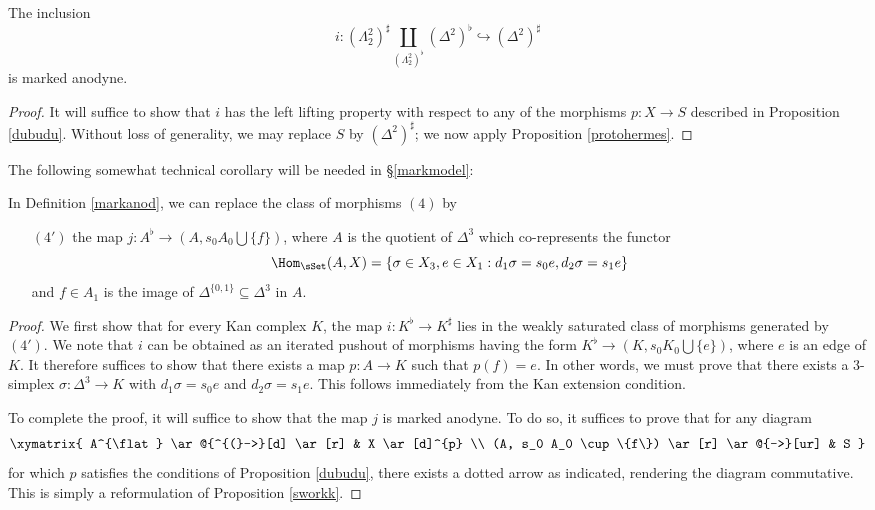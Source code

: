 \begin{corollary}\label{hermes}
The inclusion
$$ i: (\Lambda^2_2)^{\sharp} \coprod_{ (\Lambda^2_2)^{\flat} } (\Delta^2)^{\flat} \hookrightarrow (\Delta^2)^{\sharp}$$ is marked anodyne.
\end{corollary}

\begin{proof}
It will suffice to show that $i$ has the left lifting property with respect to any of the morphisms $p: X \rightarrow S$ described in Proposition \ref{dubudu}. Without loss of generality, we may replace $S$ by $(\Delta^2)^{\sharp}$; we now apply Proposition \ref{protohermes}.
\end{proof}

The following somewhat technical corollary will be needed in \S \ref{markmodel}:

\begin{corollary}\label{techycor}
In Definition \ref{markanod}, we can replace the class of morphisms $(4)$ by
\begin{itemize}
\item[$(4')$] the map $j: A^{\flat} \rightarrow (A, s_0 A_0 \bigcup \{f\} )$, where
$A$ is the quotient of $\Delta^3$ which co-represents the functor
$$ \Hom_{\sSet}(A,X) = \{ \sigma \in X_3, e \in X_1: d_1 \sigma = s_0 e, 
d_2 \sigma = s_1 e \}$$ and $f \in A_1$ is the image of
$\Delta^{ \{0,1\}} \subseteq \Delta^3$ in $A$.
\end{itemize}
\end{corollary}

\begin{proof}
We first show that for every Kan complex $K$, the map $i: K^{\flat} \rightarrow K^{\sharp}$
lies in the weakly saturated class of morphisms generated by $(4')$. We note that $i$ can be obtained 
as an iterated pushout of morphisms having the form
$K^{\flat} \rightarrow (K, s_0 K_0 \bigcup \{e\})$, where $e$ is an edge of $K$. It therefore suffices to show that there exists a map $p: A \rightarrow K$ such that $p(f) = e$. In other words, we must prove that there exists a $3$-simplex $\sigma: \Delta^3 \rightarrow K$ with $d_1 \sigma = s_0 e$ and $d_2 \sigma = s_1 e$. This follows immediately from the Kan extension condition.

To complete the proof, it will suffice to show that the map $j$ is marked anodyne.
To do so, it suffices to prove that for any diagram
$$ \xymatrix{ A^{\flat} \ar@{^{(}->}[d] \ar[r] & X \ar[d]^{p} \\
(A, s_0 A_0 \cup \{f\}) \ar[r] \ar@{-->}[ur] & S }$$
for which $p$ satisfies the conditions of Proposition \ref{dubudu}, there
exists a dotted arrow as indicated, rendering the diagram commutative. This is
simply a reformulation of Proposition \ref{sworkk}.
\end{proof}

